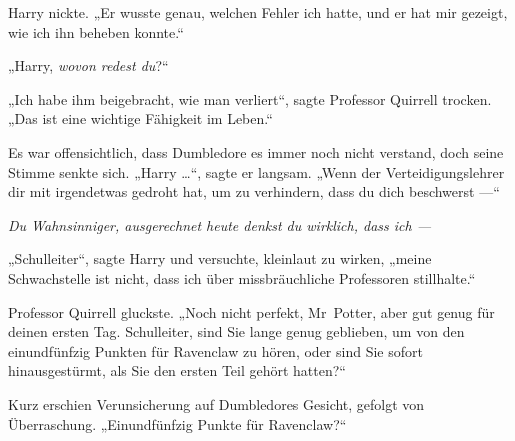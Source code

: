 Harry nickte.
„Er wusste genau, welchen Fehler ich hatte, und er hat mir gezeigt, wie ich ihn beheben konnte.“

„Harry, \emph{wovon redest du}?“

„Ich habe ihm beigebracht, wie man verliert“, sagte Professor Quirrell trocken.
„Das ist eine wichtige Fähigkeit im Leben.“

Es war offensichtlich, dass Dumbledore es immer noch nicht verstand, doch seine Stimme senkte sich.
„Harry …“, sagte er langsam.
„Wenn der Verteidigungslehrer dir mit irgendetwas gedroht hat, um zu verhindern, dass du dich beschwerst —“

\emph{Du Wahnsinniger, ausgerechnet heute denkst du wirklich, dass ich —}

„Schulleiter“, sagte Harry und versuchte, kleinlaut zu wirken, „meine Schwachstelle ist nicht, dass ich über missbräuchliche Professoren stillhalte.“

Professor Quirrell gluckste.
„Noch nicht perfekt, Mr~Potter, aber gut genug für deinen ersten Tag. Schulleiter, sind Sie lange genug geblieben, um von den einundfünfzig Punkten für Ravenclaw zu hören, oder sind Sie sofort hinausgestürmt, als Sie den ersten Teil gehört hatten?“

Kurz erschien Verunsicherung auf Dumbledores Gesicht, gefolgt von Überraschung.
„Einundfünfzig Punkte für Ravenclaw?“

